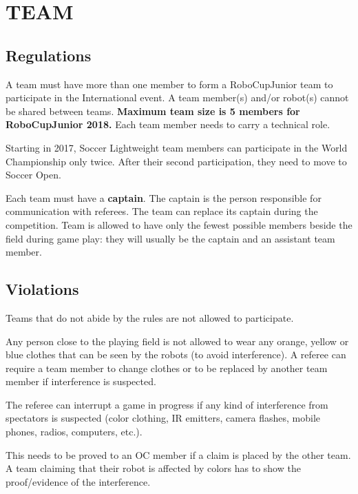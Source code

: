 \documentclass{article}
\begin{document}
\textbf{}

\section{TEAM \label{ref-015}}

\subsection{ Regulations \label{ref-016}}

A team must have more than one member to form a RoboCupJunior team to participate in the International event. A team member(s) and/or robot(s) cannot be shared between teams. \textbf{Maximum team size is 5 members for RoboCupJunior 2018.} Each team member needs to carry a technical role.

Starting in 2017, Soccer Lightweight team members can participate in the World Championship only twice. After their second participation, they need to move to Soccer Open.

Each team must have a \textbf{captain}. The captain is the person responsible for communication with referees. The team can replace its captain during the competition. Team is allowed to have only the fewest possible members beside the field during game play: they will usually be the captain and an assistant team member.

\subsection{ Violations \label{ref-017}}

Teams that do not abide by the rules are not allowed to participate.



Any person close to the playing field is not allowed to wear any orange, yellow or blue clothes that can be seen by the robots (to avoid interference). A referee can require a team member to change clothes or to be replaced by another team member if interference is suspected.

The referee can interrupt a game in progress if any kind of interference from spectators is suspected (color clothing, IR emitters, camera flashes, mobile phones, radios, computers, etc.).

This needs to be proved to an OC member if a claim is placed by the other team. A team claiming that their robot is affected by colors has to show the proof/evidence of the interference.
\end{document}
